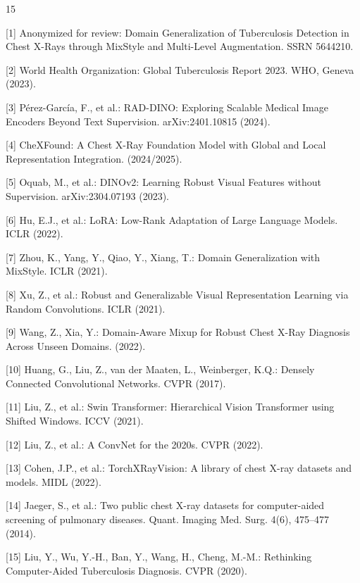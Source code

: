 \documentclass[runningheads]{llncs}
\begin{document}
\begin{thebibliography}{15}

[1] Anonymized for review: Domain Generalization of Tuberculosis Detection in
Chest X-Rays through MixStyle and Multi-Level Augmentation. SSRN 5644210.

[2] World Health Organization: Global Tuberculosis Report 2023. WHO, Geneva
(2023).

[3] P\'erez-Garc\'ia, F., et al.: RAD-DINO: Exploring Scalable Medical Image
Encoders Beyond Text Supervision. arXiv:2401.10815 (2024).

[4] CheXFound: A Chest X-Ray Foundation Model with Global and Local
Representation Integration. (2024/2025).

[5] Oquab, M., et al.: DINOv2: Learning Robust Visual Features without
Supervision. arXiv:2304.07193 (2023).

[6] Hu, E.J., et al.: LoRA: Low-Rank Adaptation of Large Language Models. ICLR
(2022).

[7] Zhou, K., Yang, Y., Qiao, Y., Xiang, T.: Domain Generalization with
MixStyle. ICLR (2021).

[8] Xu, Z., et al.: Robust and Generalizable Visual Representation Learning via
Random Convolutions. ICLR (2021).

[9] Wang, Z., Xia, Y.: Domain-Aware Mixup for Robust Chest X-Ray Diagnosis
Across Unseen Domains. (2022).

[10] Huang, G., Liu, Z., van der Maaten, L., Weinberger, K.Q.: Densely Connected
Convolutional Networks. CVPR (2017).

[11] Liu, Z., et al.: Swin Transformer: Hierarchical Vision Transformer using
Shifted Windows. ICCV (2021).

[12] Liu, Z., et al.: A ConvNet for the 2020s. CVPR (2022).

[13] Cohen, J.P., et al.: TorchXRayVision: A library of chest X-ray datasets and
models. MIDL (2022).

[14] Jaeger, S., et al.: Two public chest X-ray datasets for computer-aided
screening of pulmonary diseases. Quant. Imaging Med. Surg. 4(6), 475--477
(2014).

[15] Liu, Y., Wu, Y.-H., Ban, Y., Wang, H., Cheng, M.-M.: Rethinking
Computer-Aided Tuberculosis Diagnosis. CVPR (2020).

\end{thebibliography}
\end{document}
